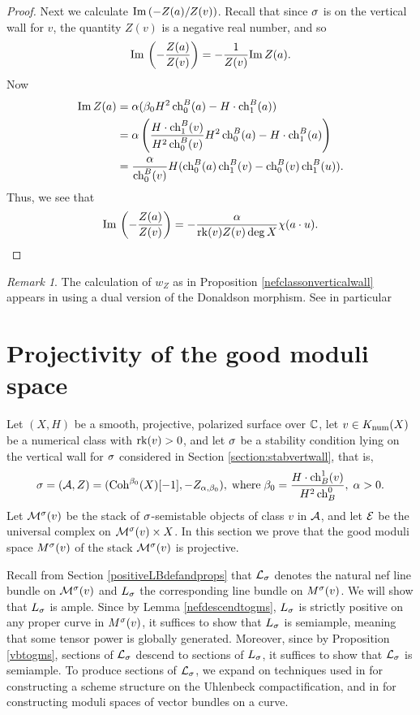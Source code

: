 \documentclass[letterpaper,12pt]{amsart}
\theoremstyle{remark}
\newtheorem{rmk}[thm]{Remark}
\begin{document}
\begin{proof}
    Next we calculate $\mathrm{Im}\,(-Z(a)/Z(v))$. Recall that since $\sigma$ is on the vertical wall for $v$, the quantity $Z(v)$ is a negative real number, and so 
    \[ \mathrm{Im}\,\left(-\frac{Z(a)}{Z(v)}\right) = -\frac{1}{Z(v)} \mathrm{Im}\, Z(a). \]
    Now 
    \begin{align*}
        \mathrm{Im}\, Z(a) & = \alpha(\beta_0 H^2 \operatorname{\mathrm{ch}}^B_0(a) - H \cdot \operatorname{\mathrm{ch}}^B_1(a)) \\
        & = \alpha \left( \frac{H \cdot \operatorname{\mathrm{ch}}^B_1(v)}{H^2 \operatorname{\mathrm{ch}}^B_0(v)} H^2 \operatorname{\mathrm{ch}}^B_0(a) - H \cdot \operatorname{\mathrm{ch}}^B_1(a) \right) \\
        & = \frac{\alpha}{\operatorname{\mathrm{ch}}^B_0(v)} H (\operatorname{\mathrm{ch}}^B_0(a) \operatorname{\mathrm{ch}}^B_1(v) - \operatorname{\mathrm{ch}}^B_0(v) \operatorname{\mathrm{ch}}^B_1(u)).
    \end{align*}
    Thus, we see that
    \[ \mathrm{Im}\,\left(-\frac{Z(a)}{Z(v)}\right) = -\frac{\alpha}{\operatorname{\mathrm{rk}}(v) Z(v) \deg X} \chi(a \cdot u). \]
\end{proof}

\begin{rmk}
    The calculation of $w_Z$ as in Proposition \ref{nefclassonverticalwall} appears in \cite{liuwanmin} using a dual version of the Donaldson morphism. See in particular \cite[Theorem 4.13(b)]{liuwanmin}
\end{rmk}



\section{Projectivity of the good moduli space}

Let $(X, H)$ be a smooth, projective, polarized surface over $\mathbb{C}$, let $v \in K_{\mathrm{num}}(X)$ be a numerical class with $\operatorname{\mathrm{rk}}(v) > 0$, and let $\sigma$ be a stability condition lying on the vertical wall for $\sigma$ considered in Section \ref{section:stabvertwall}, that is,
\[ \sigma = (\mathcal{A}, Z) = (\mathrm{Coh}^{\beta_0}(X)[-1], -Z_{\alpha, \beta_0}), \; \mathrm{where} \; \beta_0 = \frac{H \cdot \operatorname{\mathrm{ch}}_B^1(v)}{H^2 \operatorname{\mathrm{ch}}_B^0}, \; \alpha > 0. \]
Let $\mathcal{M}^\sigma(v)$ be the stack of $\sigma$-semistable objects of class $v$ in $\mathcal{A}$, and let $\mathcal{E}$ be the universal complex on $\mathcal{M}^\sigma(v) \times X$. In this section we prove that the good moduli space $M^\sigma(v)$ of the stack $\mathcal{M}^\sigma(v)$ is projective. 

Recall from Section \ref{positiveLBdefandprops} that $\mathcal{L}_\sigma$ denotes the natural nef line bundle on $\mathcal{M}^\sigma(v)$ and $L_\sigma$ the corresponding line bundle on $M^\sigma(v)$. We will show that $L_\sigma$ is ample. Since by Lemma \ref{nefdescendtogms}, $L_\sigma$ is strictly positive on any proper curve in $M^\sigma(v)$, it suffices to show that $L_\sigma$ is semiample, meaning that some tensor power is globally generated. Moreover, since by Proposition \ref{vbtogms}, sections of $\mathcal{L}_\sigma$ descend to sections of $L_\sigma$, it suffices to show that $\mathcal{L}_\sigma$ is semiample. To produce sections of $\mathcal{L}_\sigma$, we expand on techniques used in \cite{li} for constructing a scheme structure on the Uhlenbeck compactification, and in \cite{seshadri} for constructing moduli spaces of vector bundles on a curve. 
\end{document}
